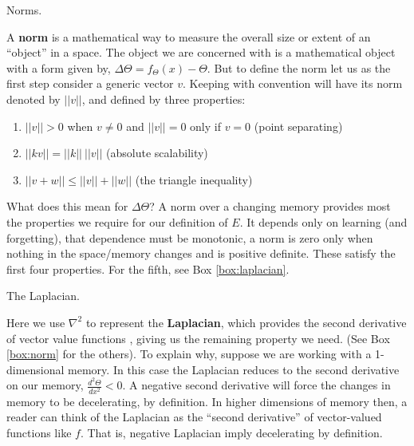 \begin{featurebox}
\caption{Norms.}
\label{box:norm}
A \textbf{norm} is a mathematical way to measure the overall size or extent of an ``object'' in a space. The object we are concerned with is a mathematical object with a form given by, $\Delta \Theta = f_{\Theta}(x) - \Theta$. But to define the norm let us as the first step consider a generic vector $v$. Keeping with convention will have its norm denoted by $||v||$, and defined by three properties:

\begin{enumerate}
  \item $||v|| > 0$ when $v \neq 0$ and $||v|| = 0$ only if $v=0$ (point separating)
  \item $||k v|| = ||k||\ ||v||$ (absolute scalability)
  \item $||v + w|| \leq ||v|| + ||w||$ (the triangle inequality)
\end{enumerate}

What does this mean for $\Delta \Theta$? A norm over a changing memory provides most the properties we require for our definition of $E$. It depends only on learning (and forgetting), that dependence must be monotonic, a norm is zero only when nothing in the space/memory changes and is positive definite. These satisfy the first four properties. For the fifth, see Box \ref{box:laplacian}.
\medskip
\end{featurebox}

\begin{featurebox}
	\caption{The Laplacian.}
	\label{box:laplacian}
	Here we use $\nabla^2$ to represent the \textbf{Laplacian}, which provides the second derivative of vector value functions \cite{needed}, giving us the remaining property we need. (See Box \ref{box:norm} for the others). To explain why, suppose we are working with a 1- dimensional memory. In this case the Laplacian reduces to the second derivative on our memory, $\frac{d^2\Theta}{dx^2} < 0$. A negative second derivative will force the changes in memory to be decelerating, by definition. In higher dimensions of memory then, a reader can think of the Laplacian as the ``second derivative'' of vector-valued functions like $f$. That is, negative Laplacian imply decelerating by definition.
	\medskip
\end{featurebox}


